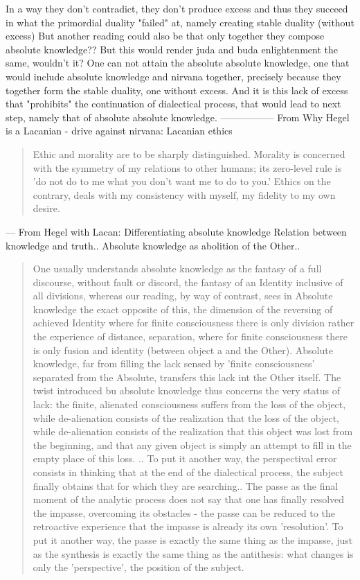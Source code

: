 \documentclass{book}
\begin{document}
In a way they don't contradict, they don't produce excess and thus they succeed in what the primordial duality "failed" at, namely creating stable duality (without excess)
But another reading could also be that only together they compose absolute knowledge?? But this would render juda and buda enlightenment the same, wouldn't it?
One can not attain the absolute absolute knowledge, one that would include absolute knowledge and nirvana together, precisely because they together form the stable duality, one without excess. And it is this lack of excess that "prohibits" the continuation of dialectical process, that would lead to next step, namely that of absolute absolute knowledge.
-----------------
From Why Hegel is a Lacanian - drive against nirvana: Lacanian ethics
\begin{quotation}
Ethic and morality are to be sharply distinguished. Morality is concerned with the symmetry of my relations to other humans; its zero-level rule is 'do not do to me what you don't want me to do to you.' Ethics on the contrary, deals with my consistency with myself, my fidelity to my own desire.
\end{quotation}
---
From Hegel with Lacan: Differentiating absolute knowledge
Relation between knowledge and truth..
Absolute knowledge as abolition of the Other..
\begin{quotation}
One usually understands absolute knowledge as the fantasy of a full discourse, without fault or discord, the fantasy of an Identity inclusive of all divisions, whereas our reading, by way of contrast, sees in Absolute knowledge the exact opposite of this, the dimension of the reversing of achieved Identity where for finite consciousness there is only division rather the experience of distance, separation, where for finite consciousness there is only fusion and identity (between object a and the Other). Absolute knowledge, far from filling the lack sensed by 'finite consciousness' separated from the Absolute, transfers this lack int the Other itself. The twist introduced bu absolute knowledge thus concerns the very status of lack: the finite, alienated consciousness suffers from the loss of the object, while de-alienation consists of the realization that the loss of the object, while de-alienation consists of the realization that this object was lost from the beginning, and that any given object is simply an attempt to fill in the empty place of this loss.
.. To put it another way, the perspectival error consists in thinking that at the end of the dialectical process, the subject finally obtains that for which they are searching..
The passe as the final moment of the analytic process does not say that one has finally resolved the impasse, overcoming its obstacles - the passe can be reduced to the retroactive experience that the impasse is already its own 'resolution'. To put it another way, the passe is exactly the same thing as the impasse, just as the synthesis is exactly the same thing as the antithesis: what changes is only the 'perspective', the position of the subject.
\end{quotation}
\end{document}
